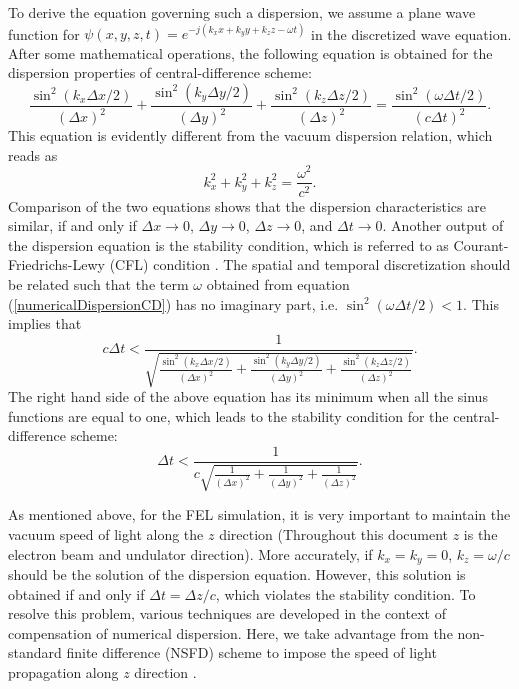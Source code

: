 To derive the equation governing such a dispersion, we assume a plane wave function for $\psi(x,y,z,t) = e^{-j(k_xx+k_yy+k_zz-\omega t)}$ in the discretized wave equation.
%
After some mathematical operations, the following equation is obtained for the dispersion properties of central-difference scheme:
%
\begin{equation}
\label{numericalDispersionCD}
\frac{\sin^2(k_x\Delta x/2)}{(\Delta x)^2} + \frac{\sin^2(k_y\Delta y/2)}{(\Delta y)^2} + \frac{\sin^2(k_z\Delta z/2)}{(\Delta z)^2} = \frac{\sin^2(\omega \Delta t/2)}{(c\Delta t)^2}.
\end{equation}
%
This equation is evidently different from the vacuum dispersion relation, which reads as
%
\begin{equation}
\label{vacuumDispersionCD}
k_x^2+k_y^2+k_z^2=\frac{\omega^2}{c^2}.
\end{equation}
%
Comparison of the two equations shows that the dispersion characteristics are similar, if and only if $\Delta x \rightarrow 0$, $\Delta y \rightarrow 0$, $\Delta z \rightarrow 0$, and $\Delta t \rightarrow 0$.
%
Another output of the dispersion equation is the stability condition, which is referred to as Courant-Friedrichs-Lewy (CFL) condition \cite{taflove2000computational}.
%
The spatial and temporal discretization should be related such that the term $\omega$ obtained from equation (\ref{numericalDispersionCD}) has no imaginary part, i.e. $\sin^2(\omega \Delta t/ 2) < 1$.
%
This implies that
%
\begin{equation}
c\Delta t < \frac{1}{\sqrt{\frac{\sin^2(k_x\Delta x/2)}{(\Delta x)^2} + \frac{\sin^2(k_y\Delta y/2)}{(\Delta y)^2} + \frac{\sin^2(k_z\Delta z/2)}{(\Delta z)^2}}} .
\end{equation}
%
The right hand side of the above equation has its minimum when all the sinus functions are equal to one, which leads to the stability condition for the central-difference scheme:
%
\begin{equation}
\label{CFLcondition}
\Delta t < \frac{1}{c\sqrt{\frac{1}{(\Delta x)^2} + \frac{1}{(\Delta y)^2} + \frac{1}{(\Delta z)^2}}}.
\end{equation}

As mentioned above, for the FEL simulation, it is very important to maintain the vacuum speed of light along the $z$ direction (Throughout this document $z$ is the electron beam and undulator direction).
%
More accurately, if $k_x=k_y=0$, $k_z=\omega/c$ should be the solution of the dispersion equation.
%
However, this solution is obtained if and only if $\Delta t = \Delta z /c$, which violates the stability condition.
%
To resolve this problem, various techniques are developed in the context of compensation of numerical dispersion.
%
Here, we take advantage from the non-standard finite difference (NSFD) scheme to impose the speed of light propagation along $z$ direction \cite{shlager2003comparison,finkelstein2007finite}.


